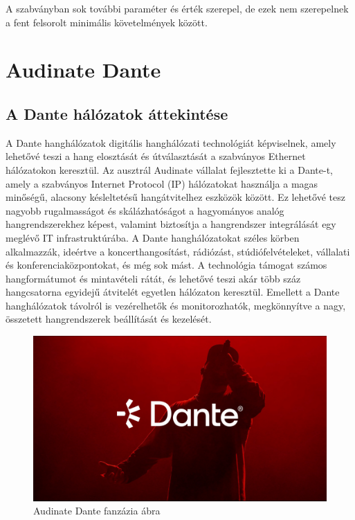 A szabványban sok további paraméter és érték szerepel, de ezek nem szerepelnek a
fent felsorolt minimális követelmények között.

\section{Audinate Dante}
\subsection{A Dante hálózatok áttekintése}
A Dante hanghálózatok digitális hanghálózati technológiát képviselnek, amely
lehetővé teszi a hang elosztását és útválasztását a szabványos Ethernet
hálózatokon keresztül. Az ausztrál Audinate vállalat fejlesztette ki a Dante-t,
amely a szabványos Internet Protocol (IP) hálózatokat használja a magas minőségű,
alacsony késleltetésű hangátvitelhez eszközök között. Ez lehetővé tesz
nagyobb rugalmasságot és skálázhatóságot a hagyományos analóg hangrendszerekhez
képest, valamint biztosítja a hangrendszer integrálását egy meglévő IT infrastruktúrába.
A Dante hanghálózatokat széles körben alkalmazzák, ideértve a koncerthangosítást,
rádiózást, stúdiófelvételeket, vállalati és konferenciaközpontokat, és még sok mást.
A technológia támogat számos hangformátumot és mintavételi rátát, és lehetővé
teszi akár több száz hangcsatorna egyidejű átvitelét egyetlen hálózaton keresztül.
Emellett a Dante hanghálózatok távolról is vezérelhetők és monitorozhatók,
megkönnyítve a nagy, összetett hangrendszerek beállítását és kezelését.
\begin{figure}[H]
	\centering
	\includegraphics[width=\linewidth, keepaspectratio]{figures/dante_visual.jpg}
	\caption{Audinate Dante fanzázia ábra}
	\label {fig:dante_visual}
\end{figure}

